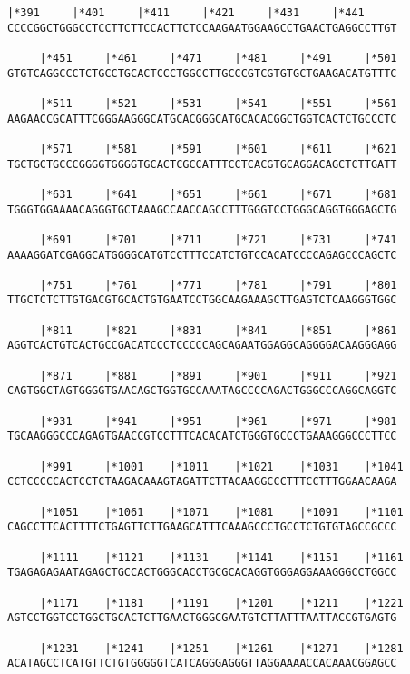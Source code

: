 \documentclass{article}
\begin{document}
\begin{Verbatim}[fontfamily=courier]
     |*391     |*401     |*411     |*421     |*431     |*441
CCCCGGCTGGGCCTCCTTCTTCCACTTCTCCAAGAATGGAAGCCTGAACTGAGGCCTTGT

     |*451     |*461     |*471     |*481     |*491     |*501
GTGTCAGGCCCTCTGCCTGCACTCCCTGGCCTTGCCCGTCGTGTGCTGAAGACATGTTTC

     |*511     |*521     |*531     |*541     |*551     |*561
AAGAACCGCATTTCGGGAAGGGCATGCACGGGCATGCACACGGCTGGTCACTCTGCCCTC

     |*571     |*581     |*591     |*601     |*611     |*621
TGCTGCTGCCCGGGGTGGGGTGCACTCGCCATTTCCTCACGTGCAGGACAGCTCTTGATT

     |*631     |*641     |*651     |*661     |*671     |*681
TGGGTGGAAAACAGGGTGCTAAAGCCAACCAGCCTTTGGGTCCTGGGCAGGTGGGAGCTG

     |*691     |*701     |*711     |*721     |*731     |*741
AAAAGGATCGAGGCATGGGGCATGTCCTTTCCATCTGTCCACATCCCCAGAGCCCAGCTC

     |*751     |*761     |*771     |*781     |*791     |*801
TTGCTCTCTTGTGACGTGCACTGTGAATCCTGGCAAGAAAGCTTGAGTCTCAAGGGTGGC

     |*811     |*821     |*831     |*841     |*851     |*861
AGGTCACTGTCACTGCCGACATCCCTCCCCCAGCAGAATGGAGGCAGGGGACAAGGGAGG

     |*871     |*881     |*891     |*901     |*911     |*921
CAGTGGCTAGTGGGGTGAACAGCTGGTGCCAAATAGCCCCAGACTGGGCCCAGGCAGGTC

     |*931     |*941     |*951     |*961     |*971     |*981
TGCAAGGGCCCAGAGTGAACCGTCCTTTCACACATCTGGGTGCCCTGAAAGGGCCCTTCC

     |*991     |*1001    |*1011    |*1021    |*1031    |*1041
CCTCCCCCACTCCTCTAAGACAAAGTAGATTCTTACAAGGCCCTTTCCTTTGGAACAAGA

     |*1051    |*1061    |*1071    |*1081    |*1091    |*1101
CAGCCTTCACTTTTCTGAGTTCTTGAAGCATTTCAAAGCCCTGCCTCTGTGTAGCCGCCC

     |*1111    |*1121    |*1131    |*1141    |*1151    |*1161
TGAGAGAGAATAGAGCTGCCACTGGGCACCTGCGCACAGGTGGGAGGAAAGGGCCTGGCC

     |*1171    |*1181    |*1191    |*1201    |*1211    |*1221
AGTCCTGGTCCTGGCTGCACTCTTGAACTGGGCGAATGTCTTATTTAATTACCGTGAGTG

     |*1231    |*1241    |*1251    |*1261    |*1271    |*1281
ACATAGCCTCATGTTCTGTGGGGGTCATCAGGGAGGGTTAGGAAAACCACAAACGGAGCC

\end{Verbatim}
\newpage
\end{document}
